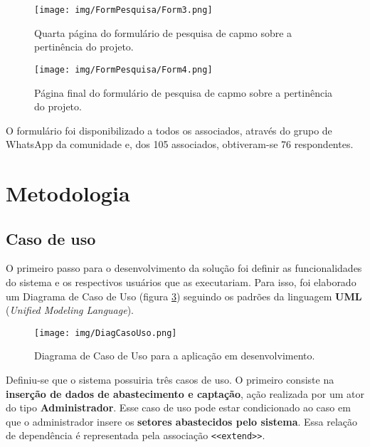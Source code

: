 \begin{figure}[htbp!]
    \centering
    \suppressfloats[t]
    \texttt{[image: img/FormPesquisa/Form3.png]}
    \caption{Quarta página do formulário de pesquisa de capmo sobre a pertinência do projeto.}
    \label{fig:Form3}
\end{figure}

\begin{figure}[htbp!]
    \centering
    \suppressfloats[t]
    \texttt{[image: img/FormPesquisa/Form4.png]}
    \caption{Página final do formulário de pesquisa de capmo sobre a pertinência do projeto.}
    \label{fig:Form4}
\end{figure}

O formulário foi disponibilizado a todos os associados, através do grupo de WhatsApp da comunidade e, dos 105 associados, obtiveram-se 76 respondentes.



\section{Metodologia}\label{sec:Metodologia}

\subsection{Caso de uso}\label{subsec:casoDeUso}

O primeiro passo para o desenvolvimento da solução foi definir as funcionalidades do sistema e os respectivos usuários que as executariam. Para isso, foi elaborado um Diagrama de Caso de Uso (figura \ref{fig:DiagCasoUso}) seguindo os padrões da linguagem \textbf{UML} (\textit{Unified Modeling Language}). \cite{umlGuia}

\begin{figure}[htbp!]
    \centering
    \suppressfloats[t]
    \texttt{[image: img/DiagCasoUso.png]}
    \caption{Diagrama de Caso de Uso para a aplicação em desenvolvimento.}
    \label{fig:DiagCasoUso}
\end{figure}

Definiu-se que o sistema possuiria três casos de uso. O primeiro consiste na \textbf{inserção de dados de abastecimento e captação}, ação realizada por um ator do tipo \textbf{Administrador}. Esse caso de uso pode estar condicionado ao caso em que o administrador insere os \textbf{setores abastecidos pelo sistema}. Essa relação de dependência é representada pela associação \verb|<<extend>>|. \cite{larman}

